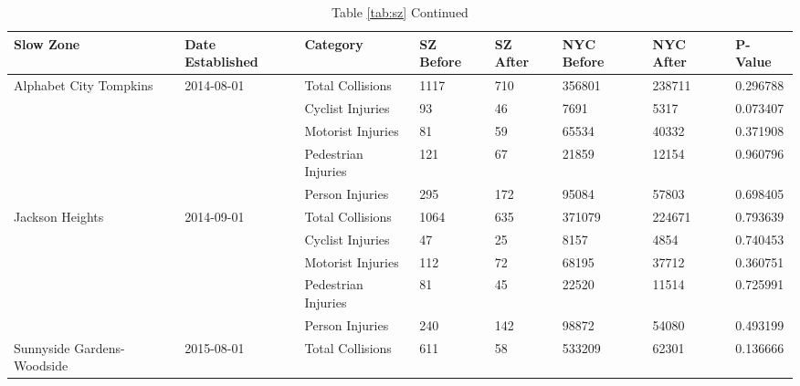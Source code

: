 \documentclass[10pt,journal,compsoc]{IEEEtran}
\begin{document}
\begin{table}[]
\centering
\caption{Table \ref{tab:sz} Continued}
\label{tab:sz2}
\begin{tabular}{|l|l|l|l|l|l|l|l|}
\hline
Slow Zone                                   & Date Established            & Category            & SZ Before & SZ After & NYC Before & NYC After & P-Value  \\ \hline
\multirow{5}{*}{Alphabet City Tompkins}     & \multirow{5}{*}{2014-08-01} & Total Collisions    & 1117      & 710      & 356801     & 238711    & 0.296788 \\ \cline{3-8} 
                                            &                             & Cyclist Injuries    & 93        & 46       & 7691       & 5317      & 0.073407 \\ \cline{3-8} 
                                            &                             & Motorist Injuries   & 81        & 59       & 65534      & 40332     & 0.371908 \\ \cline{3-8} 
                                            &                             & Pedestrian Injuries & 121       & 67       & 21859      & 12154     & 0.960796 \\ \cline{3-8} 
                                            &                             & Person Injuries     & 295       & 172      & 95084      & 57803     & 0.698405 \\ \hline
\multirow{5}{*}{Jackson Heights}            & \multirow{5}{*}{2014-09-01} & Total Collisions    & 1064      & 635      & 371079     & 224671    & 0.793639 \\ \cline{3-8} 
                                            &                             & Cyclist Injuries    & 47        & 25       & 8157       & 4854      & 0.740453 \\ \cline{3-8} 
                                            &                             & Motorist Injuries   & 112       & 72       & 68195      & 37712     & 0.360751 \\ \cline{3-8} 
                                            &                             & Pedestrian Injuries & 81        & 45       & 22520      & 11514     & 0.725991 \\ \cline{3-8} 
                                            &                             & Person Injuries     & 240       & 142      & 98872      & 54080     & 0.493199 \\ \hline
\multirow{5}{*}{Sunnyside Gardens-Woodside} & \multirow{5}{*}{2015-08-01} & Total Collisions    & 611       & 58       & 533209     & 62301     & 0.136666 \\ \cline{3-8} 

\end{tabular}
\end{table}
\end{document}

